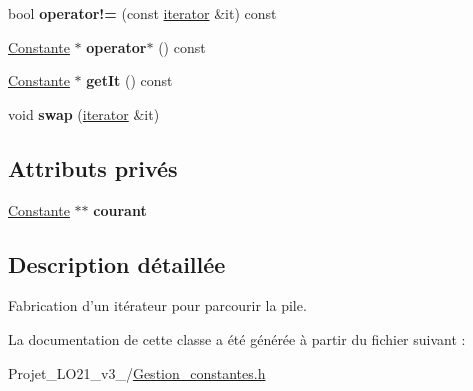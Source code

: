 \begin{DoxyCompactItemize}
\item 
\hypertarget{class_stack_1_1iterator_a51e29caedfcff04927f50629275d6b79}{bool {\bfseries operator!=} (const \hyperlink{class_stack_1_1iterator}{iterator} \&it) const }\label{class_stack_1_1iterator_a51e29caedfcff04927f50629275d6b79}

\item 
\hypertarget{class_stack_1_1iterator_ad0c0d548f2189cf62d44a9b9e1860b88}{\hyperlink{class_calcul_1_1_constante}{Constante} $\ast$ {\bfseries operator$\ast$} () const }\label{class_stack_1_1iterator_ad0c0d548f2189cf62d44a9b9e1860b88}

\item 
\hypertarget{class_stack_1_1iterator_a29db2d0193cf47fb1d12e50c7219b355}{\hyperlink{class_calcul_1_1_constante}{Constante} $\ast$ {\bfseries get\-It} () const }\label{class_stack_1_1iterator_a29db2d0193cf47fb1d12e50c7219b355}

\item 
\hypertarget{class_stack_1_1iterator_a968852ab69c70d5529c931bf61d6c2c1}{void {\bfseries swap} (\hyperlink{class_stack_1_1iterator}{iterator} \&it)}\label{class_stack_1_1iterator_a968852ab69c70d5529c931bf61d6c2c1}

\end{DoxyCompactItemize}
\subsection*{Attributs privés}
\begin{DoxyCompactItemize}
\item 
\hypertarget{class_stack_1_1iterator_add429619c85e291fb72d4344dec0ccf9}{\hyperlink{class_calcul_1_1_constante}{Constante} $\ast$$\ast$ {\bfseries courant}}\label{class_stack_1_1iterator_add429619c85e291fb72d4344dec0ccf9}

\end{DoxyCompactItemize}


\subsection{Description détaillée}
Fabrication d'un itérateur pour parcourir la pile. 

La documentation de cette classe a été générée à partir du fichier suivant \-:\begin{DoxyCompactItemize}
\item 
Projet\-\_\-\-L\-O21\-\_\-v3\-\_/\hyperlink{_gestion__constantes_8h}{Gestion\-\_\-constantes.\-h}\end{DoxyCompactItemize}
